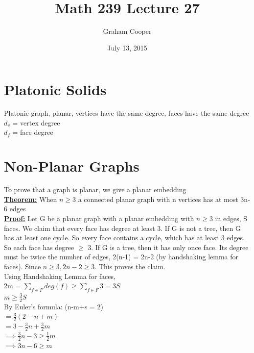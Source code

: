\documentclass[12pt]{article}
\title{\vspace{-15ex}Math 239 Lecture 27\vspace{-1ex}}
\date{July 13, 2015}
\author{Graham Cooper}
\newcommand{\myt}[1]{\textbf{\underline{#1}}}
\begin{document}
	\maketitle
	
	\section*{Platonic Solids}
	
	Platonic graph, planar, vertices have the same degree, faces have the same degree\\
	$d_v$ = vertex degree\\
	$d_f$ = face degree\\
	
	\section*{Non-Planar Graphs}
	To prove that a graph is planar, we give a planar embedding\\
	
	\myt{Theorem:} When $n \geq 3$ a connected planar graph with n vertices has at most 3n-6 edges\\
	
	\myt{Proof:} Let G be a planar graph with a planar embedding with $n \geq 3$ in edges, S faces. We claim that every face has degree at least 3. If G is not a tree, then G has at least one cycle. So every face contains a cycle, which has at least 3 edges. So each face has degree $\geq$ 3. If G is a tree, then it has only once face. Its degree must be twice the number of edges, 2(n-1) = 2n-2 (by handshaking lemma for faces). Since $n \geq 3, 2n-2 \geq 3$. This proves the claim.\\
	
	Using Handshaking Lemma for faces, \\
	2m = $\sum_{f \in F} deg(f) \geq \sum_{f \in F}3 = 3S$\\
	$m \geq \frac{3}{2}S$\\
	By Euler's formula: (n-m+s = 2)\\
	$= \frac{3}{2}(2-n+m)$\\
	$= 3 - \frac{3}{2}n + \frac{3}{2}m$\\
	$\implies \frac{3}{2}n - 3 \geq \frac{1}{2}m$\\
	$\implies 3n - 6 \geq m$\\
	
\end{document}
